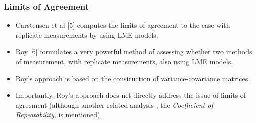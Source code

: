\documentclass[compress]{beamer}        %
\begin{document}
%
%


\begin{frame}
\frametitle{Limits of Agreement}
\begin{itemize}
\item Carstensen et al [5] computes the limits of agreement to the case with replicate measurements by using LME models.
\item Roy [6] formulates a very powerful method of assessing whether two methods of measurement, with replicate measurements, also using LME models. 
\item Roy's approach is based on the construction of variance-covariance matrices.
\item Importantly, Roy's approach does not directly address the issue of limits of agreement (although another related analysis , the \emph{Coefficient of Repeatability}, is mentioned).
\end{itemize}
\end{frame}
\end{document}
